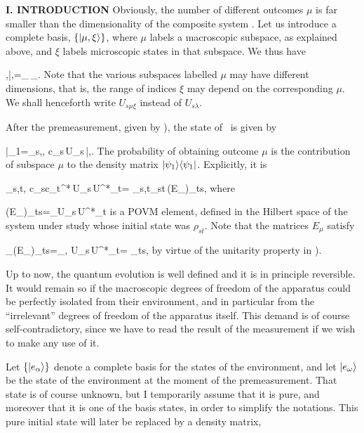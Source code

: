 \begin{center}{\bf I. INTRODUCTION}
Obviously, the number of different outcomes $\mu$ is far smaller than
the dimensionality of the composite system \cC. Let us introduce a
complete basis, $\{|\mu,\xi\rangle\}$, where $\mu$ labels a macroscopic
subspace, as explained above, and $\xi$ labels microscopic states in
that subspace. We thus have

\beq \6\mu,\xi|\nu,\eta\9=\delta_{\mu\nu}\,\delta_{\xi\eta}.\eeq
Note that the various subspaces labelled $\mu$ may have different
dimensions, that is, the range of indices $\xi$ may depend on the
corresponding $\mu$. We shall henceforth write $U_{s\mu\xi}$ instead of
$U_{s\lambda}$.

After the premeasurement, given by ), the state of \cC\ is
given by

\beq |\psi_1\9=\sum_{s,\mu,\xi} c_s\,U_{s\mu\xi}\,|\mu,\xi\9.
 \label{psi1} \eeq
The probability of obtaining outcome $\mu$ is the contribution of
subspace $\mu$ to the density matrix $|\psi_1\rangle\langle\psi_1|$. Explicitly,
it is

\beq \sum_{s,t,\xi} c_sc_t^*\,U_{s\mu\xi}\,U^*_{t\mu\xi}=
  \sum_{s,t}\rho_{st}\,(E_\mu)_{ts}, \label{prob}\eeq
where

\beq (E_\mu)_{ts}=\sum_\xi U_{s\mu\xi}\,U^*_{t\mu\xi} \label{povm}\eeq
is a POVM element, defined in the Hilbert space of the system under
study whose initial state was $\rho_{st}$. Note that the matrices
$E_\mu$ satisfy

\beq \sum_\mu(E_\mu)_{ts}=\sum_{\mu,\xi} U_{s\mu\xi}\,U^*_{t\mu\xi}=
 \delta_{ts}, \eeq
by virtue of the unitarity property in ).

\ec

Up to now, the quantum evolution is well defined and it is in principle
reversible. It would remain so if the macroscopic degrees of freedom of
the apparatus could be perfectly isolated from their environment, and in
particular from the ``irrelevant'' degrees of freedom of the apparatus
itself. This demand is of course self-contradictory, since we have to
read the result of the measurement if we wish to make any use of it.

Let $\{|e_\alpha\rangle\}$ denote a complete basis for the states of the
environment, and let $|e_\omega\rangle$ be the state of the environment at
the moment of the premeasurement. That state is of course unknown, but I
temporarily assume that it is pure, and moreover that it is one of the
basis states, in order to simplify the notations. This pure initial
state will later be replaced by a density matrix,


\end{center}
